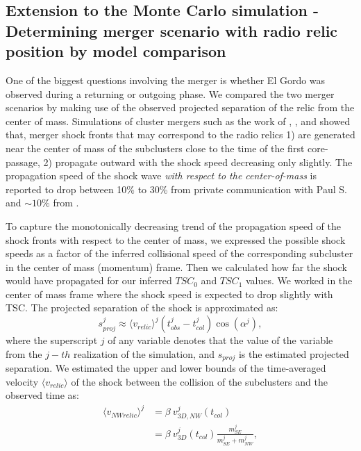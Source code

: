 
\subsection{Extension to the Monte Carlo simulation - Determining merger
scenario with radio relic position by model comparison}

One of the biggest questions involving the merger is whether El Gordo was
observed during a returning or outgoing phase. We compared the two merger
scenarios by making use of the observed projected separation of the relic from the
center of mass.
Simulations of cluster mergers such as the work of \citet{Paul2011b},
\citet{VanWeerenRJ2011}, and \citet{Springel2007} showed that, merger shock
fronts that may correspond to the radio relics 1) are generated near the
center of mass of the subclusters close to the time of the first
core-passage, 2) propagate outward with the shock speed decreasing only slightly.
The propagation speed of the shock wave {\it with respect to the
center-of-mass} is reported to drop between 10\% to
30\% from private communication with Paul S. and $\sim 10\%$ from
\citet{Springel2007}. \par 
To capture the monotonically decreasing trend of the
propagation speed of the shock fronts with respect to the center of
mass, we expressed the possible shock speeds as a factor of the inferred
collisional speed of the corresponding subcluster in the center of mass
(momentum) frame. 
Then we calculated how far the shock would have propagated for our inferred
$TSC_0$ and $TSC_1$ values. We worked in the center of mass frame where the
shock speed is expected to drop slightly with TSC. 
The projected separation of the shock is approximated as:
\begin{equation}
	s^j_{proj} \approx \langle v_{relic} \rangle^j (t^j_{obs} - t^j_{col})
	\cos(\alpha^j),
	\label{eq:proj_s_model}
\end{equation}
where the superscript $j$ of any variable denotes that the value of the
variable from the $j-th$ realization of the simulation, and $s_{proj}$ is the estimated projected
separation. We estimated the upper and lower bounds of the time-averaged velocity
$\langle v_{relic} \rangle$ of the shock between
the collision of the subclusters and the observed time as:  
\begin{align}
	\label{eqn:NW_speed}
	\langle v_{NW relic} \rangle^j &= \beta~v^j_{3D, NW}(t_{col}) \\
	&= \beta~v^j_{3D}(t_{col}) \frac{m^j_{SE}}{m^j_{SE} + m^j_{NW}}, 
\end{align}
